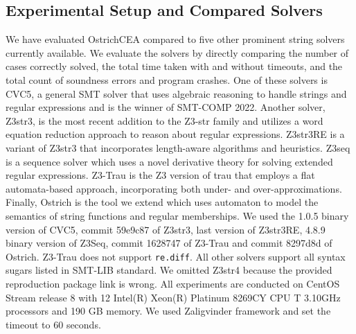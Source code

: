 \documentclass{standalone}
\begin{document}
\subsection{Experimental Setup and Compared Solvers}
We have evaluated OstrichCEA compared to five other prominent string solvers currently available. We evaluate the solvers by directly comparing the number of cases correctly solved, the total time taken with and without timeouts, and the total count of soundness errors and program crashes. One of these solvers is CVC5\cite{cvc5}, a general SMT solver that uses algebraic reasoning to handle strings and regular expressions and is the winner of SMT-COMP 2022\cite{smt-comp}. Another solver, Z3str3\cite{z3str3}, is the most recent addition to the Z3-str family and utilizes a word equation reduction approach to reason about regular expressions. Z3str3RE\cite{z3str3re} is a variant of Z3str3 that incorporates length-aware algorithms and heuristics. Z3seq\cite{z3seq} is a sequence solver which uses a novel derivative theory for solving extended regular expressions. Z3-Trau\cite{z3trau} is the Z3 version of trau\cite{trau} that employs a flat automata-based approach, incorporating both under- and over-approximations. Finally, Ostrich\cite{ostrich} is the tool we extend which uses automaton to model the semantics of string functions and regular memberships. We used the 1.0.5 binary version of CVC5, commit 59e9c87 of Z3str3, last version of Z3str3RE, 4.8.9 binary version of Z3Seq, commit 1628747 of Z3-Trau and commit 8297d8d of Ostrich. Z3-Trau does not support \verb|re.diff|. All other solvers support all syntax sugars listed in SMT-LIB standard\cite{smt_lib}. We omitted Z3str4\cite{z3str4} because the provided reproduction package link is wrong. All experiments are conducted on CentOS Stream release 8 with 12 Intel(R) Xeon(R) Platinum 8269CY CPU T 3.10GHz processors and 190 GB memory. We used Zaligvinder\cite{zaligvinder_2021} framework and set the timeout to 60 seconds. 
\end{document}
